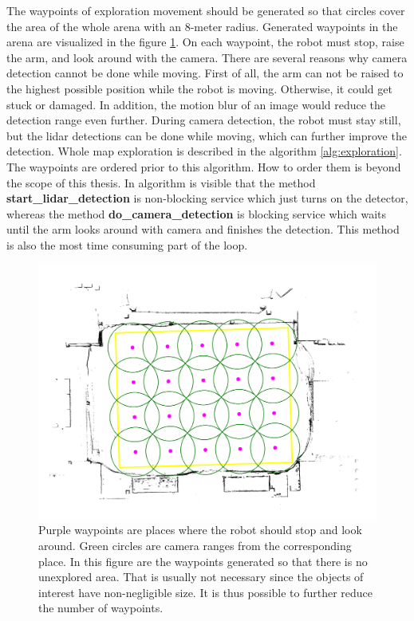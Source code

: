 The waypoints of exploration movement should be generated so that circles cover the area of the whole arena with an 8-meter radius. Generated waypoints in the arena are visualized in the figure \ref{fig:map_annot}. On each waypoint, the robot must stop, raise the arm, and look around with the camera. There are several reasons why camera detection cannot be done while moving. First of all, the arm can not be raised to the highest possible position while the robot is moving. Otherwise, it could get stuck or damaged. In addition, the motion blur of an image would reduce the detection range even further. During camera detection, the robot must stay still, but the lidar detections can be done while moving, which can further improve the detection. Whole map exploration is described in the algorithm \ref{alg:exploration}. The waypoints are ordered prior to this algorithm. How to order them is beyond the scope of this thesis. In algorithm is visible that the method \textbf{start\_lidar\_detection} is non-blocking service which just turns on the detector, whereas the method \textbf{do\_camera\_detection} is blocking service which waits until the arm looks around with camera and finishes the detection. This method is also the most time consuming part of the loop.

\begin{figure}[H]
	\centering
	\includegraphics[scale=0.25]{fig/map_annotation.png}
	\caption[Generated waypoints]{Purple waypoints are places where the robot should stop and look around. Green circles are camera ranges from the corresponding place. In this figure are the waypoints generated so that there is no unexplored area. That is usually not necessary since the objects of interest have non-negligible size. It is thus possible to further reduce the number of waypoints.}
	\label{fig:map_annot}
\end{figure}


